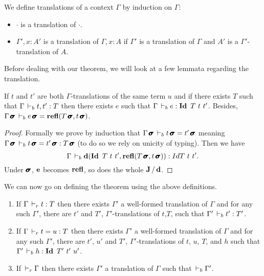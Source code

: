 \documentclass[a4paper,english]{lipics-utf8x}
\begin{document}
  \begin{definition}
    We define translations of a context $\Gamma$ by induction on $\Gamma$:
    \begin{itemize}
      \item $\cdot$ is a translation of $\cdot$.
      \item $\Gamma', x:A'$ is a translation of $\Gamma, x:A$ if $\Gamma'$ is
            a translation of $\Gamma$ and $A'$ is a $\Gamma'$-translation of
            $A$.
    \end{itemize}
  \end{definition}
  Before dealing with our theorem, we will look at a few lemmata regarding the
  translation.

  \begin{lemma}
    \label{lem:transleq}
    If $t$ and $t'$ are both $\Gamma$-translations of the same term $u$ and if
    there exists $T$ such that $\Gamma \,\vdash_b t, t' : T$ then there exists $e$
    such that $\Gamma \derb e : \Id T\ t\ t'$.
    Besides, $\Gamma \operatorname{\pmb{\bm{\sigma}}} \,\vdash_b e \operatorname{\pmb{\bm{\sigma}}} = \operatorname{\mathbf{refl}}(T\operatorname{\pmb{\bm{\sigma}}},t\operatorname{\pmb{\bm{\sigma}}})$.
  \end{lemma}

  \begin{proof}
    Formally we prove by induction that
    $\Gamma \operatorname{\pmb{\bm{\sigma}}} \,\vdash_b t \operatorname{\pmb{\bm{\sigma}}} = t' \operatorname{\pmb{\bm{\sigma}}}$
    meaning $\Gamma \operatorname{\pmb{\bm{\sigma}}} \,\vdash_b t \operatorname{\pmb{\bm{\sigma}}} = t' \operatorname{\pmb{\bm{\sigma}}} : T\operatorname{\pmb{\bm{\sigma}}}$
    (to do so we rely on unicity of typing).
    Then we have
    \[
      \Gamma \,\vdash_b \operatorname{\mathbf{d}}(\operatorname{\mathbf{Id}~} T\ t\ t', \operatorname{\mathbf{refl}}(T\operatorname{\pmb{\bm{\sigma}}}, t\operatorname{\pmb{\bm{\sigma}}})) : Id T\ t\ t'.
    \]
    Under $\operatorname{\pmb{\bm{\sigma}}}$, $\operatorname{\mathbf{e}}$ becomes $\operatorname{\mathbf{refl}}$, so does the whole $\operatorname{\mathbf{J}}/\operatorname{\mathbf{d}}$.
  \end{proof}


  We can now go on defining the theorem using the above definitions.

  \begin{theorem}[Translation]
    \label{thm:transl}
    \leavevmode
    \begin{enumerate}
      \item If $\Gamma \,\vdash_r t : T$ then there exists $\Gamma'$ a well-formed
      translation of $\Gamma$ and for any such $\Gamma'$, there are $t'$ and
      $T'$, $\Gamma'$-translations of $t$,$T$,
      such that $\Gamma' \,\vdash_b t' : T'$.
      \item If $\Gamma \,\vdash_r t = u : T$ then there exists $\Gamma'$ a
      well-formed translation of $\Gamma$ and for any such $\Gamma'$, there are
      $t'$, $u'$ and $T'$, $\Gamma'$-translations of $t$, $u$, $T$, and $h$ such
      that $\Gamma' \derb h : \Id T'\ t'\ u'$.
      \item If $\,\vdash_r \Gamma$ then there exists $\Gamma'$ a translation of
      $\Gamma$ such that $\,\vdash_b \Gamma'$.
    \end{enumerate}
  \end{theorem}
\end{document}
